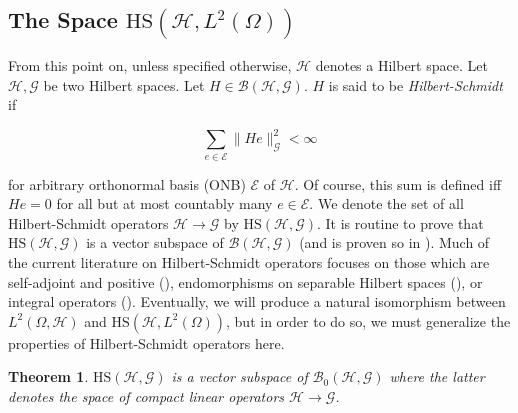 \documentclass{article}
\newtheorem{theorem}{Theorem}
\numberwithin{theorem}{section}
\numberwithin{lemma}{section}
\numberwithin{definition}{section}
\numberwithin{assumption}{section}
\numberwithin{proposition}{section}
\numberwithin{remark}{section}
\numberwithin{corollary}{section}
\numberwithin{conjecture}{section}
\numberwithin{example}{section}
\newcommand{\E}{\mathbb{E}}
\newcommand{\HS}{\mathrm{HS}}
\newcommand{\CH}{\mathcal H}
\begin{document}
\begin{multicols*}{2}

\subsection{The Space $\HS(\mathcal H, L^2(\Omega))$} \label{Background on Hilbert-Schmidt Operators}


From this point on, unless specified otherwise, $\CH$ denotes a Hilbert space. Let $\mathcal H, \mathcal G$ be two Hilbert spaces. Let $H \in \mathcal B(\mathcal H, \mathcal G)$. $H$ is said to be \textit{Hilbert-Schmidt} if


$$\sum_{e \in \mathscr E} \|He\|^2_\mathcal G < \infty$$


for arbitrary orthonormal basis (ONB) $\mathscr E$ of $\mathcal H$. Of course, this sum is defined iff $He = 0$ for all but at most countably many $e \in \mathscr E$. We denote the set of all Hilbert-Schmidt operators $\mathcal H \to \mathcal G$ by $\HS(\mathcal H, \mathcal G)$. It is routine to prove that $\HS(\mathcal H, \mathcal G)$ is a vector subspace of $\mathcal B(\mathcal H, \mathcal G)$ (and is proven so in \cite{Berberian2014}). Much of the current literature on Hilbert-Schmidt operators focuses on those which are self-adjoint and positive (\cite{Muger2022,kth,Shapiro2024}), endomorphisms on separable Hilbert spaces (\cite{kth,WangUSTC,Rosenweig,Melrose2018,Shapiro2024}), or integral operators (\cite{Garrett2012}). Eventually, we will produce a natural isomorphism between $L^2(\Omega, \CH)$ and $\HS(\CH, L^2(\Omega))$, but in order to do so, we must generalize the properties of Hilbert-Schmidt operators here. 


 \begin{theorem} \label{HS opearators are compact}
     $\mathrm{HS}(\mathcal H, \mathcal G)$ is a vector subspace of $\mathcal B_0(\mathcal H, \mathcal G)$ where the latter denotes the space of compact linear operators $\mathcal H \to \mathcal G$. 
 \end{theorem} 


\end{multicols*}
\end{document}
